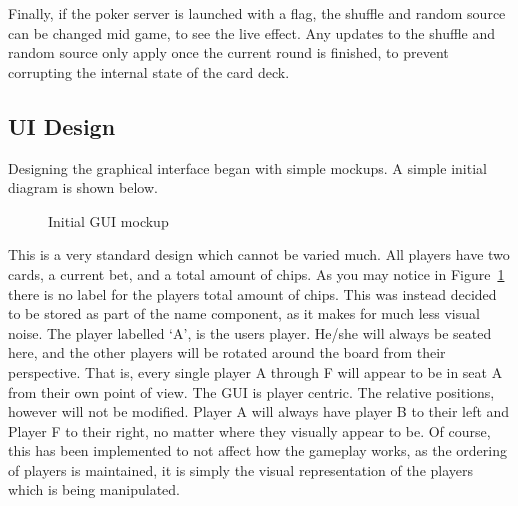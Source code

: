 Finally, if the poker server is launched with a flag, the shuffle and random
source can be changed mid game, to see the live effect. Any updates to the
shuffle and random source only apply once the current round is finished, to
prevent corrupting the internal state of the card deck.

\subsection{UI Design}
Designing the graphical interface began with simple mockups. A simple
initial diagram is shown below.

\begin{figure}[h]
    \caption{Initial GUI mockup}%
    \label{fig:initialgui}
\end{figure}

This is a very standard design which cannot be varied much. All players have
two cards, a current bet, and a total amount of chips. As you may notice
in Figure~\ref{fig:initialgui} there is no label for the players total amount
of chips. This was instead decided to be stored as part of the name component,
as it makes for much less visual noise. The player labelled `A', is the
users player. He/she will always be seated here, and the other players will
be rotated around the board from their perspective. That is, every single
player A through F will appear to be in seat A from their own point of view.
The GUI is player centric. The relative positions, however will not be 
modified. Player A will always have player B to their left and Player F to 
their right, no matter where they visually appear to be. Of course, this has 
been implemented to not affect how the gameplay works, as the ordering of 
players is maintained, it is simply the visual representation of the players 
which is being manipulated.

